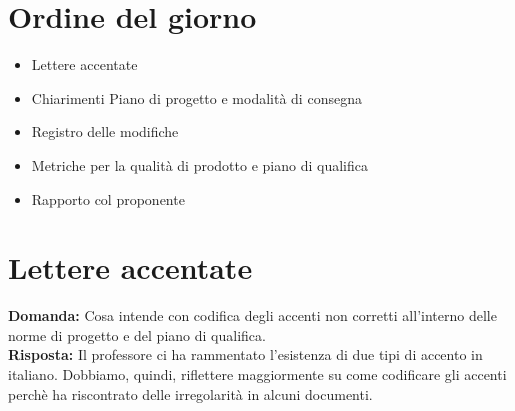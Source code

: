 \documentclass{article}
\begin{document}
\section{Ordine del giorno}%
\label{sec:ordine_del_giorno}

\begin{itemize}
  \item Lettere accentate
  \item Chiarimenti Piano di progetto e modalità di consegna
  \item Registro delle modifiche
  \item Metriche per la qualità di prodotto e piano di qualifica
  \item Rapporto col proponente
\end{itemize}
\section{Lettere accentate}%
\label{sec:lettere_accentate}
\textbf{Domanda:} Cosa intende con codifica degli accenti non corretti all'interno delle norme di progetto e  del piano di qualifica. \\
\textbf{Risposta:} Il professore ci ha rammentato l'esistenza di due tipi di accento in italiano. Dobbiamo, quindi, riflettere maggiormente su come codificare gli accenti perchè ha riscontrato delle irregolarità in alcuni documenti.
\end{document}
